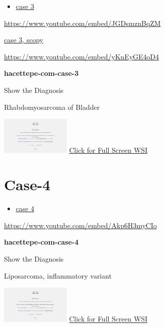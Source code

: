 \documentclass[
  letterpaper,
  paper=6in:9in,
  pagesize=pdftex,
  headinclude=on,
  footinclude=on,
  12pt]{scrbook}
\providecommand{\tightlist}{%
  \setlength{\itemsep}{0pt}\setlength{\parskip}{0pt}}\usepackage{longtable,booktabs,array}
\begin{document}
\begin{itemize}
\tightlist
\item
  \href{https://www.youtube.com/watch?v=JGDsmznBqZM\&ab_channel=KemalKosemehmetoglu}{case
  3}
\end{itemize}

\url{https://www.youtube.com/embed/JGDsmznBqZM}

\href{https://www.youtube.com/watch?v=yKnEyGE4oD4\&ab_channel=KemalKosemehmetoglu}{case
3, scopy}

\url{https://www.youtube.com/embed/yKnEyGE4oD4}

\textbf{hacettepe-com-case-3}

Show the Diagnosis

\hypertarget{answer3}{}
Rhabdomyosarcoma of Bladder

\href{https://images.patolojiatlasi.com/hacettepe-com-case-3/HE.html}{\includegraphics[width=0.25\textwidth,height=\textheight]{./screenshots/hacettepe-com-case-3_screenshot.png}}
\href{https://images.patolojiatlasi.com/hacettepe-com-case-3/HE.html}{Click
for Full Screen WSI}

\hypertarget{sec-hacettepe-case-of-the-month-case-4}{%
\section{Case-4}\label{sec-hacettepe-case-of-the-month-case-4}}

\begin{itemize}
\tightlist
\item
  \href{https://www.youtube.com/watch?v=Akp6H3myCIo\&ab_channel=KemalKosemehmetoglu}{case
  4}
\end{itemize}

\url{https://www.youtube.com/embed/Akp6H3myCIo}

\textbf{hacettepe-com-case-4}

Show the Diagnosis

\hypertarget{answer4}{}
Liposarcoma, inflammatory variant

\href{https://images.patolojiatlasi.com/hacettepe-com-case-4/HE.html}{\includegraphics[width=0.25\textwidth,height=\textheight]{./screenshots/hacettepe-com-case-4_screenshot.png}}
\href{https://images.patolojiatlasi.com/hacettepe-com-case-4/HE1.html}{Click
for Full Screen WSI}
\end{document}
